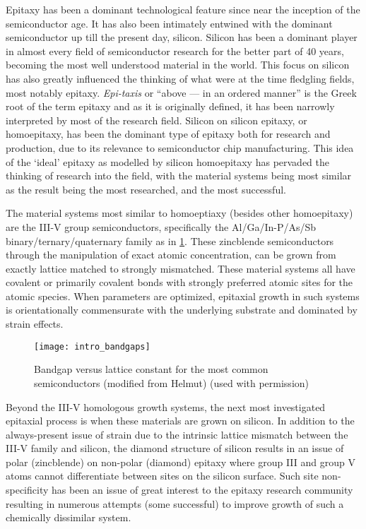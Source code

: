 Epitaxy has been a dominant technological feature since near the inception of the semiconductor age.
It has also been intimately entwined with the dominant semiconductor up till the present day, silicon.
Silicon has been a dominant player in almost every field of semiconductor research for the better part of 40 years, becoming the most well understood material in the world.
This focus on silicon has also greatly influenced the thinking of what were at the time fledgling fields, most notably epitaxy.
\emph{Epi-taxis} or ``above --- in an ordered manner'' is the Greek root of the term epitaxy and as it is originally defined, it has been narrowly interpreted by most of the research field.
Silicon on silicon epitaxy, or homoepitaxy, has been the dominant type of epitaxy both for research and production, due to its relevance to semiconductor chip manufacturing.
This idea of the `ideal' epitaxy as modelled by silicon homoepitaxy has pervaded the thinking of research into the field, with the material systems being most similar as the result being the most researched, and the most successful.

The material systems most similar to homoeptiaxy (besides other homoepitaxy) are the III-V group semiconductors, specifically the Al/Ga/In-P/As/Sb bi\-nary/ter\-nary/qua\-ter\-nary family as in \cref{fig:intro_bandgaps}.
These zincblende semiconductors through the manipulation of exact atomic concentration, can be grown from exactly lattice matched to strongly mismatched.
These material systems all have covalent or primarily covalent bonds with strongly preferred atomic sites for the atomic species.
When parameters are optimized, epitaxial growth in such systems is orientationally commensurate with the underlying substrate and dominated by strain effects.
\begin{figure}
 \centering \texttt{[image: intro\_bandgaps]}
 \caption[Bandgap versus lattice constant]{\label{fig:intro_bandgaps}Bandgap versus lattice constant for the most common semiconductors (modified from Helmut\cite{HelmutFoll2013}) (used with permission)}
\end{figure}

Beyond the III-V homologous growth systems, the next most investigated epitaxial process is when these materials are grown on silicon.
In addition to the always-present issue of strain due to the intrinsic lattice mismatch between the III-V family and silicon, the diamond structure of silicon results in an issue of polar (zincblende) on non-polar (diamond) epitaxy\cite{Kroemer1987} where group III and group V atoms cannot differentiate between sites on the silicon surface.
Such site non-specificity has been an issue of great interest to the epitaxy research community resulting in numerous attempts (some successful)\cite{Kroemer1987} to improve growth of such a chemically dissimilar system.

